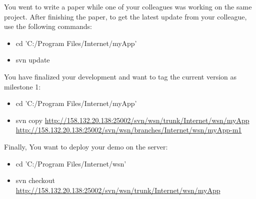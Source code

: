 You went to write a paper while one of your colleagues was working on the same project. After finishing the paper, to get the latest update from your colleague, use the following commands:
\begin{itemize}
\item cd 'C:/Program Files/Internet/myApp'
\item svn update
\end{itemize}

You have finalized your development and want to tag the current version as milestone 1:
\begin{itemize}
\item cd 'C:/Program Files/Internet/myApp'
\item svn copy \url{http://158.132.20.138:25002/svn/wsn/trunk/Internet/wsn/myApp} \url{http://158.132.20.138:25002/svn/wsn/branches/Internet/wsn/myApp-m1}
\end{itemize}

Finally, You want to deploy your demo on the server:
\begin{itemize}
\item cd 'C:/Program Files/Internet/wsn'
\item svn checkout \url{http://158.132.20.138:25002/svn/wsn/trunk/Internet/wsn/myApp}
\end{itemize}